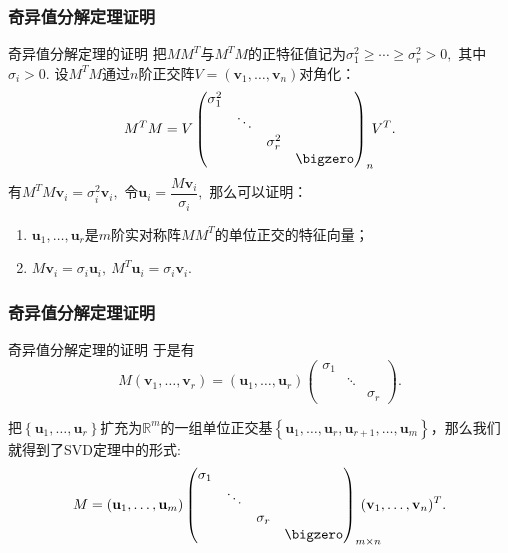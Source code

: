 
\begin{frame}
\frametitle{奇异值分解定理证明}

\begin{block}{奇异值分解定理的证明}
把$MM^T$与$M^TM$的正特征值记为$\sigma_1^2 \geqslant \cdots \geqslant \sigma_r^2 > 0,$ 其中$\sigma_i>0.$ 设$M^TM$通过$n$阶正交阵$V = (\mathbf{v}_1,\ldots,\mathbf{v}_n)$对角化：
\[M^TM = V \begin{pmatrix}
\sigma_1^2 & & & \\ & \ddots & & \\ & & \sigma_r^2 & \\ & & & \bigzero \end{pmatrix}_n\!\! V^T.\]
有$M^TM\mathbf{v}_i = \sigma_i^2\mathbf{v}_i,$ 令$\mathbf{u}_i = \dfrac{M\mathbf{v}_i}{\sigma_i},$ 那么可以证明：

\pause

\begin{enumerate}
\item $\mathbf{u}_1, \ldots, \mathbf{u}_r$是$m$阶实对称阵$MM^T$的单位正交的特征向量；
\item $M\mathbf{v}_i = \sigma_i\mathbf{u}_i, \ M^T\mathbf{u}_i = \sigma_i\mathbf{v}_i.$
\end{enumerate}
\end{block}

\end{frame}


\begin{frame}
\frametitle{奇异值分解定理证明}

\begin{block}{奇异值分解定理的证明}
于是有
\[M(\mathbf{v}_1,\ldots,\mathbf{v}_r) = (\mathbf{u}_1,\ldots,\mathbf{u}_r) \begin{pmatrix}
\sigma_1 & & \\ & \ddots & \\ & & \sigma_r \end{pmatrix}.\]

\pause

把$\left\{ \mathbf{u}_1,\ldots,\mathbf{u}_r \right\}$扩充为$\mathbb{R}^m$的一组单位正交基$\left\{ \mathbf{u}_1,\ldots,\mathbf{u}_r,  \mathbf{u}_{r+1},\ldots,\mathbf{u}_m \right\}$，那么我们就得到了SVD定理中的形式:
\[M = (\mathbf{u}_1,\ldots,\mathbf{u}_m) \begin{pmatrix}
\sigma_1 & & & \\ & \ddots & & \\ & & \sigma_r & \\ & & & \bigzero \end{pmatrix}_{m\times n}\!\!\!\!\!\!\!\!\!\!(\mathbf{v}_1,\ldots,\mathbf{v}_n)^T.\]
\end{block}

\end{frame}


